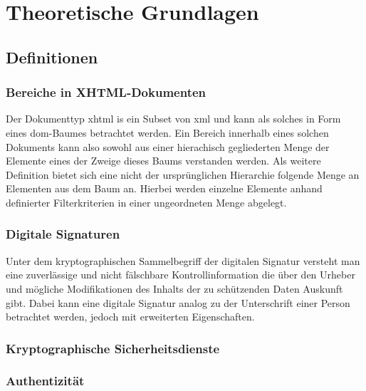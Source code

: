 
\chapter{Theoretische Grundlagen}
\label{chp:TheoretischeGrundlagen}

\section{Definitionen}
\label{sec:TheoretischeGrundlagen:Definitionen}

\subsection{Bereiche in XHTML-Dokumenten}
\label{sec:TheoretischeGrundlagen:Definitionen:BereicheXHTML}
Der Dokumenttyp \gls{xhtml} is ein Subset von \gls{xml}\cite{xhtml:w3c}\cite{xhtml:oreilly} und kann als solches in Form eines \gls{dom}-Baumes
betrachtet werden. Ein Bereich innerhalb eines solchen Dokuments kann also sowohl aus einer hierachisch gegliederten Menge der Elemente eines der Zweige dieses
Baums verstanden werden. Als weitere Definition bietet sich eine nicht der ursprünglichen Hierarchie folgende Menge an Elementen aus dem Baum an. Hierbei werden
einzelne Elemente anhand definierter Filterkriterien in einer ungeordneten Menge abgelegt.

\subsection{Digitale Signaturen}
\label{sec:TheoretischeGrundlagen:Definitionen:DigitaleSignaturen}
Unter dem kryptographischen Sammelbegriff der digitalen Signatur versteht man eine zuverlässige und nicht fälschbare Kontrollinformation die über den Urheber
und mögliche Modifikationen des Inhalts der zu schützenden Daten Auskunft gibt\cite{kits}. Dabei kann eine digitale Signatur analog zu der Unterschrift
einer Person betrachtet werden\cite{esig:bsi}, jedoch mit erweiterten Eigenschaften.

\subsection{Kryptographische Sicherheitsdienste}

\subsection{Authentizität}

